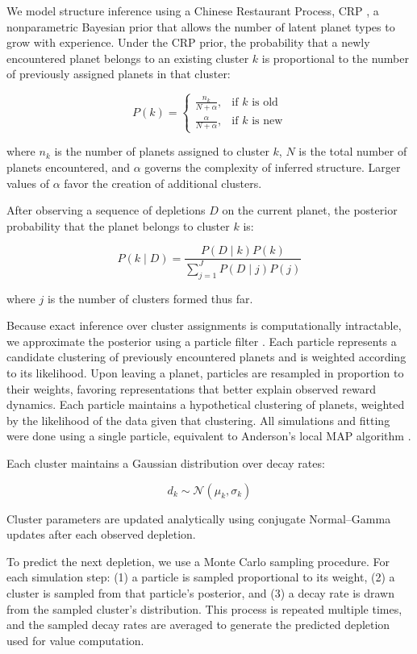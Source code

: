 \documentclass[12pt]{article}
\begin{document}
We model structure inference using a Chinese Restaurant Process, CRP \citep{antoniak1974mixtures}, a nonparametric Bayesian prior that allows the number of latent planet types to grow with experience. Under the CRP prior, the probability that a newly encountered planet belongs to an existing cluster \(k\) is proportional to the number of previously assigned planets in that cluster:

\[
P(k) =
\begin{cases}
\frac{n_k}{N + \alpha}, & \text{if } k \text{ is old} \\
\frac{\alpha}{N + \alpha}, & \text{if } k \text{ is new}
\end{cases}
\]

where \(n_k\) is the number of planets assigned to cluster \(k\), \(N\) is the total number of planets encountered, and \(\alpha\) governs the complexity of inferred structure. Larger values of \(\alpha\) favor the creation of additional clusters.

After observing a sequence of depletions \(D\) on the current planet, the posterior probability that the planet belongs to cluster \(k\) is:

\[
P(k \mid D) = \frac{P(D \mid k)P(k)}{\sum_{j=1}^{J} P(D \mid j)P(j)}
\]

where \(j\) is the number of clusters formed thus far.

Because exact inference over cluster assignments is computationally intractable, we approximate the posterior using a particle filter \citep{djuric2003particle}. Each particle represents a candidate clustering of previously encountered planets and is weighted according to its likelihood. Upon leaving a planet, particles are resampled in proportion to their weights, favoring representations that better explain observed reward dynamics. Each particle maintains a hypothetical clustering of planets, weighted by the likelihood of the data given that clustering. All simulations and fitting were done using a single particle, equivalent to Anderson’s local MAP algorithm \citep{anderson1991adaptive}.

Each cluster maintains a Gaussian distribution over decay rates:

\[
d_k \sim \mathcal{N}(\mu_k, \sigma_k)
\]

Cluster parameters are updated analytically using conjugate Normal–Gamma updates after each observed depletion.

To predict the next depletion, we use a Monte Carlo sampling procedure. For each simulation step: (1) a particle is sampled proportional to its weight, (2) a cluster is sampled from that particle’s posterior, and (3) a decay rate is drawn from the sampled cluster’s distribution. This process is repeated multiple times, and the sampled decay rates are averaged to generate the predicted depletion used for value computation.
\end{document}
